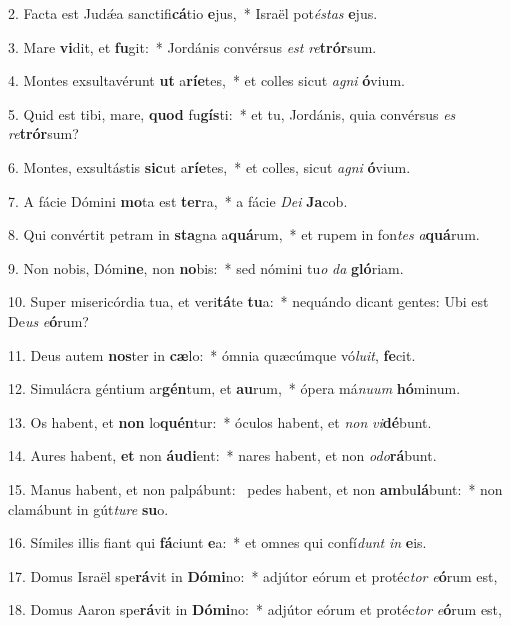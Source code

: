 2. Facta est Judǽa sanctifi\textbf{cá}tio \textbf{e}jus,~*  Israël pot\textit{és}\textit{tas} \textbf{e}jus.\

3. Mare \textbf{vi}dit, et \textbf{fu}git:~*  Jordánis convérsus \textit{est} \textit{re}\textbf{trór}sum.\

4. Montes exsultavérunt \textbf{ut} a\textbf{rí}\textbf{e}tes,~*  et colles sicut \textit{a}\textit{gni} \textbf{ó}vium.\

5. Quid est tibi, mare, \textbf{quod} fu\textbf{gís}ti:~*  et tu, Jordánis, quia convérsus \textit{es} \textit{re}\textbf{trór}sum?\

6. Montes, exsultástis \textbf{sic}ut a\textbf{rí}\textbf{e}tes,~*  et colles, sicut \textit{a}\textit{gni} \textbf{ó}vium.\

7. A fácie Dómini \textbf{mo}ta est \textbf{ter}ra,~*  a fácie \textit{De}\textit{i} \textbf{Ja}cob.\

8. Qui convértit petram in \textbf{sta}gna a\textbf{quá}rum,~*  et rupem in fon\textit{tes} \textit{a}\textbf{quá}rum.\

9. Non nobis, Dómi\textbf{ne}, non \textbf{no}bis:~*  sed nómini tu\textit{o} \textit{da} \textbf{gló}riam.\

10. Super misericórdia tua, et veri\textbf{tá}te \textbf{tu}a:~*  nequándo dicant gentes: Ubi est De\textit{us} \textit{e}\textbf{ó}rum?\

11. Deus autem \textbf{nos}ter in \textbf{cæ}lo:~*  ómnia quæcúmque vó\textit{lu}\textit{it}, \textbf{fe}cit.\

12. Simulácra géntium ar\textbf{gén}tum, et \textbf{au}rum,~*  ópera má\textit{nu}\textit{um} \textbf{hó}minum.\

13. Os habent, et \textbf{non} lo\textbf{quén}tur:~*  óculos habent, et \textit{non} \textit{vi}\textbf{dé}bunt.\

14. Aures habent, \textbf{et} non \textbf{áu}\textbf{di}ent:~*  nares habent, et non \textit{o}\textit{do}\textbf{rá}bunt.\

15. Manus habent, et non palpábunt: \dag\  pedes habent, et non \textbf{am}bu\textbf{lá}bunt:~*  non clamábunt in gút\textit{tu}\textit{re} \textbf{su}o.\

16. Símiles illis fiant qui \textbf{fá}ciunt \textbf{e}a:~*  et omnes qui confí\textit{dunt} \textit{in} \textbf{e}is.\

17. Domus Israël spe\textbf{rá}vit in \textbf{Dó}\textbf{mi}no:~*  adjútor eórum et protéc\textit{tor} \textit{e}\textbf{ó}rum est,\

18. Domus Aaron spe\textbf{rá}vit in \textbf{Dó}\textbf{mi}no:~*  adjútor eórum et protéc\textit{tor} \textit{e}\textbf{ó}rum est,\

